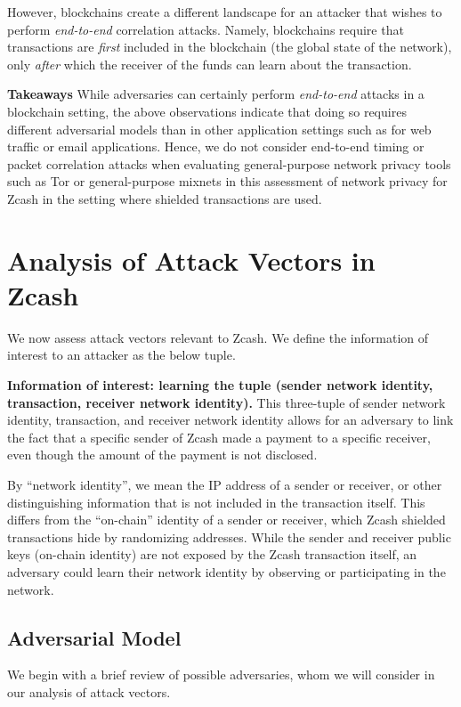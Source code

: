\documentclass{article}
\begin{document}
However, blockchains create a different landscape for an attacker that
wishes to perform \emph{end-to-end} correlation attacks. Namely, blockchains require
that transactions are \emph{first} included in the blockchain (the global state
of the network), only \emph{after} which the receiver of the funds can learn
about the transaction.


\textbf{Takeaways}
While adversaries can certainly perform \emph{end-to-end} attacks in a blockchain
setting, the above observations indicate that doing so requires different
adversarial models than in other application settings such as for web traffic or email
applications. Hence, we do not consider end-to-end timing or packet correlation
attacks when evaluating general-purpose network privacy tools such as Tor or
general-purpose mixnets in this assessment of network privacy for Zcash in the setting where
shielded transactions are used.


\section{Analysis of Attack Vectors in Zcash}
\label{threat-model}

We now assess attack vectors relevant to Zcash. We define the information of
interest to an attacker as the below tuple.

\textbf{Information of interest: learning the tuple (sender network identity, transaction, receiver network identity).}
This three-tuple of sender network identity, transaction, and receiver network
identity allows for an adversary to link the fact that a
specific sender of Zcash made a payment to a specific receiver, even though the
amount of the payment is not disclosed.

By ``network identity'', we mean the IP address of a sender or receiver, or other
distinguishing information that is not included in the transaction itself. This
differs from the ``on-chain'' identity of a sender or receiver, which Zcash
shielded transactions hide by randomizing addresses.
While the sender and receiver public keys (on-chain identity)
are not exposed by the Zcash transaction itself, an adversary
could learn their network identity by observing or participating in the
network.

\subsection{Adversarial Model}

We begin with a brief review of possible adversaries, whom we will consider in
our analysis of attack vectors.
\end{document}
